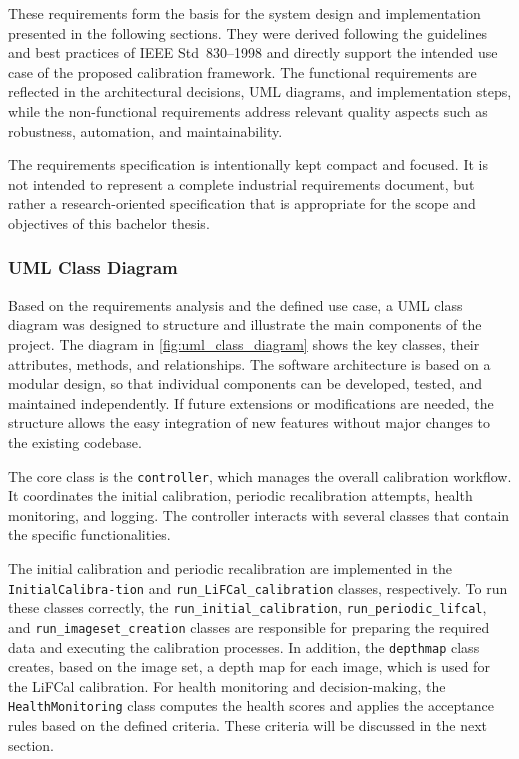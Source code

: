 \documentclass[12pt]{scrartcl}
\begin{document}
\vspace{0.2cm}
These requirements form the basis for the system design and implementation presented in the following sections. They were derived following the guidelines and best practices of IEEE Std~830--1998 \cite{720574} and directly support the intended use case of the proposed calibration framework. The functional requirements are reflected in the architectural decisions, UML diagrams, and implementation steps, while the non-functional requirements address relevant quality aspects such as robustness, automation, and maintainability.
\newline

The requirements specification is intentionally kept compact and focused. It is not intended to represent a complete industrial requirements document, but rather a research-oriented specification that is appropriate for the scope and objectives of this bachelor thesis.

\subsubsection{UML Class Diagram}

Based on the requirements analysis and the defined use case, a UML class diagram was designed to structure and illustrate the main components of the project. The diagram in \autoref{fig:uml_class_diagram} shows the key classes, their attributes, methods, and relationships. The software architecture is based on a modular design, so that individual components can be developed, tested, and maintained independently. If future extensions or modifications are needed, the structure allows the easy integration of new features without major changes to the existing codebase.
\newline 

The core class is the \texttt{controller}, which manages the overall calibration workflow. It coordinates the initial calibration, periodic recalibration attempts, health monitoring, and logging. The controller interacts with several classes that contain the specific functionalities.
\newline

The initial calibration and periodic recalibration are implemented in the \texttt{InitialCalibra-\allowbreak tion} and \texttt{run\_LiFCal\_calibration} classes, respectively. To run these classes correctly, the \texttt{run\_initial\_calibration}, \texttt{run\_periodic\_lifcal}, and \texttt{run\_imageset\_creation} classes are responsible for preparing the required data and executing the calibration processes. In addition, the \texttt{depthmap} class creates, based on the image set, a depth map for each image, which is used for the LiFCal calibration. For health monitoring and decision-making, the \texttt{HealthMonitoring} class computes the health scores and applies the acceptance rules based on the defined criteria. These criteria will be discussed in the next section.
\newline
\end{document}
